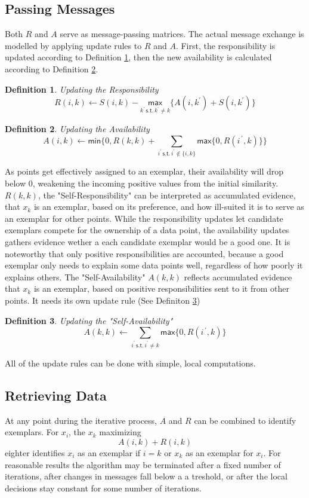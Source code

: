 \documentclass[11pt,a4paper]{article}
\newtheorem{definition}{Definition}
\begin{document}
\subsection{Passing Messages}
Both $R$ and $A$ serve as message-passing matrices. The actual message exchange is modelled by applying update rules to $R$ and $A$. First, the responsibility is updated according to Definition \ref{def:respupdate}, then the new availability is calculated according to Definition \ref{def:avupdate}.
\begin{definition}\label{def:respupdate}
	Updating the Responsibility
	\[
		R(i,k) \leftarrow S(i,k) - \underset{k^\prime\, \mathsf{s.t.}\, k^\prime \neq k}{\mathsf{max}} \{A(i,k^\prime) + S(i,k^\prime)\}
	\]
\end{definition}
\begin{definition}\label{def:avupdate}
	Updating the Availability
	\[
		A(i,k) \leftarrow \mathsf{min}\{0,R(k,k) + \sum\limits_{i^\prime\,\mathsf{s.t.}\, i^\prime \notin \{i,k\}}\mathsf{max}\{0, R(i^{\, \prime} ,k)\}\}
	\]
\end{definition}
As points get effectively assigned to an exemplar, their availability will drop below 0, weakening the incoming positive values from the initial similarity. $R(k,k)$, the "Self-Responsibility" can be interpreted as accumulated evidence, that $x_k$ is an exemplar, based on its preference, and how ill-suited it is to serve as an exemplar for other points. \cite{frey2007clustering} While the responsibility updates let candidate exemplars compete for the ownership of a data point, the availability updates gathers evidence wether a each candidate exemplar would be a good one. It is noteworthy that only positive responsibilities are accounted, because a good exemplar only needs to explain some data points well, regardless of how poorly it explains others.\cite{frey2007clustering} The "Self-Availability" $A(k,k)$ reflects accumulated evidence that $x_k$ is an exemplar, based on positive responsibilities sent to it from other points. It needs its own update rule (See Definiton \ref{def:savupdate})
\begin{definition}\label{def:savupdate}
	Updating the "Self-Availability"
	\[
   		A(k,k) \leftarrow \sum\limits_{i^\prime\, \mathsf{s.t.}\, i^\prime \neq k} \mathsf{max} \{0, R(i^{\, \prime} ,k)\}
	\]
\end{definition}
All of the update rules can be done with simple, local computations.\cite{frey2007clustering}
\subsection{Retrieving Data}
At any point during the iterative process, $A$ and $R$ can be combined to identify exemplars. For $x_i$, the $x_k$ maximizing
\[
	A(i,k) + R(i,k)
\]
eighter identifies $x_i$ as an exemplar if $i=k$ or $x_k$ as an exemplar for $x_i$. \cite{frey2007clustering} For reasonable results the algorithm may be terminated after a fixed number of iterations, after changes in messages fall below a a treshold, or after the local decisions stay constant for some number of iterations.\cite{frey2007clustering}
\end{document}
